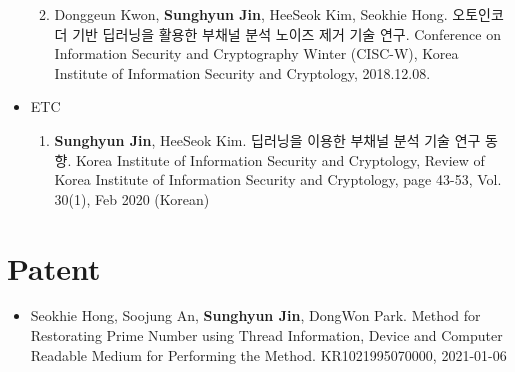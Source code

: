\documentclass[a4paper,20pt]{article}
\begin{document}
\begin{itemize}
\begin{enumerate}
            \vspace{-2pt}
            \item {Donggeun Kwon, \textbf{Sunghyun Jin}, HeeSeok Kim, Seokhie Hong. 오토인코더 기반 딥러닝을 활용한 부채널 분석 노이즈 제거 기술 연구. Conference on Information Security and Cryptography Winter (CISC-W), Korea Institute of Information Security and Cryptology, 2018.12.08.}
            \vspace{-2pt}
        \end{enumerate}
        
    \item {ETC}
        \vspace{-6pt}
        \begin{enumerate}
            \item {\textbf{Sunghyun Jin}, HeeSeok Kim. 딥러닝을 이용한 부채널 분석 기술 연구 동향. Korea Institute of Information Security and Cryptology, Review of Korea Institute of Information Security and Cryptology, page 43-53, Vol. 30(1), Feb 2020 (Korean)}
            \vspace{-2pt}
        \end{enumerate}
\end{itemize}



\section{\textbf{Patent}}
\begin{itemize}
    \item {Seokhie Hong, Soojung An, \textbf{Sunghyun Jin}, DongWon Park. Method for Restorating Prime Number using Thread Information, Device and Computer Readable Medium for Performing the Method. KR1021995070000, 2021-01-06}
\end{itemize}



\iffalse
\section{\textbf{Project}}
\item {Work in Progress}
    \vspace{-6pt}
    \begin{enumerate}
        \item {blah}
        \vspace{-2pt}
    \end{enumerate}
\begin{itemize}
    \item {blah}
    \vspace{-4pt}
\end{itemize}
\fi
\end{document}
